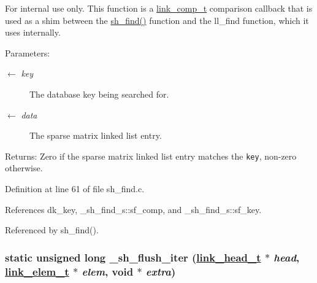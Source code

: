\begin{Desc}
\item[For internal use only.]
This function is a \hyperlink{group__dbprim__link_ga3}{link\_\-comp\_\-t} comparison callback that is used as a shim between the \hyperlink{group__dbprim__smat_ga22}{sh\_\-find()} function and the ll\_\-find function, which it uses internally.

\begin{Desc}
\item[Parameters:]
\begin{description}
\item[\mbox{$\leftarrow$} {\em key}]The database key being searched for. \item[\mbox{$\leftarrow$} {\em data}]The sparse matrix linked list entry.\end{description}
\end{Desc}
\begin{Desc}
\item[Returns:]Zero if the sparse matrix linked list entry matches the {\tt key}, non-zero otherwise.\end{Desc}
\end{Desc}


Definition at line 61 of file sh\_\-find.c.

References dk\_\-key, \_\-sh\_\-find\_\-s::sf\_\-comp, and \_\-sh\_\-find\_\-s::sf\_\-key.

Referenced by sh\_\-find().\hypertarget{group__dbprim__smat_ga28}{
\subsubsection[\_\-sh\_\-flush\_\-iter]{\setlength{\rightskip}{0pt plus 5cm}static unsigned long \_\-sh\_\-flush\_\-iter (\hyperlink{struct__link__head__s}{link\_\-head\_\-t} $\ast$ {\em head}, \hyperlink{struct__link__elem__s}{link\_\-elem\_\-t} $\ast$ {\em elem}, void $\ast$ {\em extra})}}
\label{group__dbprim__smat_ga28}


